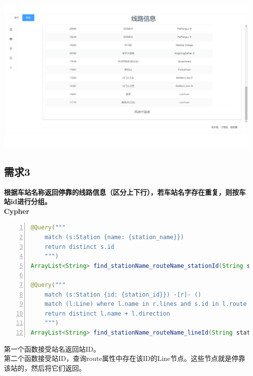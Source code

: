 \documentclass[11pt,a4paper]{article}
\begin{document}
\begin{center}
\includegraphics[scale=0.3]{./assets/demand2_4.png} 
\end{center}

\subsection{需求3}
\textbf{根据车站名称返回停靠的线路信息（区分上下行），若车站名字存在重复，则按车站id进行分组。} \\
\textbf{Cypher} \\
\begin{lstlisting}[numbers = left, 
showstringspaces=false,
showspaces = false,
breaklines = true, 
language=Java]
@Query("""
	match (s:Station {name: {station_name}})
	return distinct s.id
	""")
ArrayList<String> find_stationName_routeName_stationId(String station_name);

@Query("""
	match (s:Station {id: {station_id}}) -[r]- ()
	match (l:Line) where l.name in r.lines and s.id in l.route
	return distinct l.name + l.direction
	""")
ArrayList<String> find_stationName_routeName_lineId(String station_id);
\end{lstlisting} 
第一个函数接受站名返回站ID。 \\
第二个函数接受站ID，查询route属性中存在该ID的Line节点。这些节点就是停靠该站的，然后将它们返回。
\end{document}
